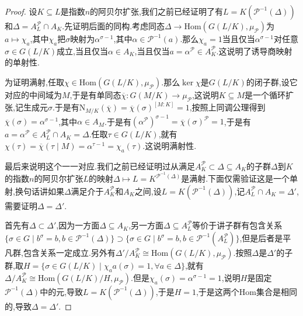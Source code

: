 \begin{enumerate}
\begin{proof}
    	设$K\subseteq L$是指数$n$的阿贝尔扩张,我们之前已经证明了有$L=K(\mathscr{P}^{-1}(\Delta))$和$\Delta=A_L^{\mathscr{P}}\cap A_K$.先证明后面的同构.考虑同态$\Delta\to\mathrm{Hom}(G(L/K),\mu_{\mathscr{P}})$为$a\mapsto\chi_a$,其中$\chi_a$把$\sigma$映射为$\alpha^{\sigma-1}$,其中$\alpha\in\mathscr{P}^{-1}(a)$.那么$\chi_a=1$当且仅当$\alpha^{\sigma-1}$对任意$\sigma\in G(L/K)$成立,当且仅当$\alpha\in A_K$,当且仅当$a=\alpha^{\mathscr{P}}\in A_K^{\mathscr{P}}$.这说明了诱导商映射的单射性.
    	
    	为证明满射,任取$\chi\in\mathrm{Hom}(G(L/K),\mu_{\mathscr{P}})$.那么$\ker\chi$是$G(L/K)$的闭子群,设它对应的中间域为$M$,于是有单同态$\overline{\chi}:G(M/K)\to\mu_{\mathscr{P}}$,这说明$K\subseteq M$是一个循环扩张,记生成元$\sigma$.于是有$\mathrm{N}_{M/K}(\overline{\chi})=\overline{\chi}(\sigma)^{[M:K]}=1$,按照上同调公理得到$\overline{\chi}(\sigma)=\alpha^{\sigma-1}$,其中$\alpha\in A_M$.于是有$(\alpha^{\mathscr{P}})^{\sigma-1}=\overline{\chi}(\sigma)^{\mathscr{P}}=1$,于是有$a=\alpha^{\mathscr{P}}\in A_L^{\mathscr{P}}\cap A_K=\Delta$.任取$\tau\in G(L/K)$,就有$\chi(\tau)=\overline{\chi}(\tau\mid M)=\alpha^{\tau-1}=\chi_a(\tau)$.这说明满射性.
    	
    	最后来说明这个一一对应.我们之前已经证明过从满足$A_K^{\mathscr{P}}\subset\Delta\subseteq A_K$的子群$\Delta$到$K$的指数$n$的阿贝尔扩张$L$的映射$\Delta\mapsto L=K^{\mathscr{P}^{-1}(\Delta)}$是满射.下面仅需验证这是一个单射,换句话讲如果$\Delta$满足介于$A_K^{\mathscr{P}}$和$A_K$之间,设$L=K(\mathscr{P}^{-1}(\Delta))$,记$A_L^{\mathscr{P}}\cap A_K=\Delta'$,需要证明$\Delta=\Delta'$.
    	
    	首先有$\Delta\subset\Delta'$,因为一方面$\Delta\subseteq A_K$,另一方面$\Delta\subseteq A_L^{\mathscr{P}}$等价于讲子群有包含关系$\{\sigma\in G\mid b^{\sigma}=b,b\in\mathscr{P}^{-1}(\Delta)\}\supset\{\sigma\in G\mid b^{\sigma}=b,b\in\mathscr{P}^{-1}(A_L^{\mathscr{P}})\}$,但是后者是平凡群,包含关系一定成立.另外有$\Delta'/A_K^{\mathscr{P}}\cong\mathrm{Hom}(G(L/K),\mu_{\mathscr{P}})$.按照$\Delta$是$\Delta'$的子群,取$H=\{\sigma\in G(L/K)\mid\chi_aa(\sigma)=1,\forall a\in\Delta\}$,就有$\Delta/A_K^{\mathscr{P}}\cong\mathrm{Hom}(G(L/K)/H,\mu_{\mathscr{P}})$.但是$\chi_a(\sigma)=\alpha^{\sigma-1}=1$,说明$H$是固定$\mathscr{P}^{-1}(\Delta)$中的元,导致$L=K(\mathscr{P}^{-1}(\Delta))$,于是$H=1$,于是这两个$\mathrm{Hom}$集合是相同的,导致$\Delta=\Delta'$.
    \end{proof}
\end{enumerate}

